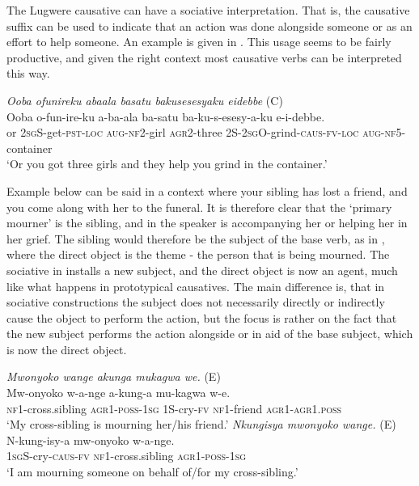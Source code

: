 \documentclass[output=paper,colorlinks,citecolor=brown,draftmode]{langscibook}
\begin{document}
The Lugwere causative can have a sociative interpretation. That is, the causative suffix can be used to indicate that an action was done alongside someone or as an effort to help someone. An example is given in . This usage seems to be fairly productive, and given the right context most causative verbs can be interpreted this way. %

\ea \label{ex:Saebo:sociative} \emph{Ooba 	ofunireku abaala basatu bakusesesyaku eidebbe} (C) \\
  \gll Ooba o-fun-ire-ku a-ba-ala ba-satu ba-ku-s-esesy-a-ku e-i-debbe. \\ 
or \textsc{2sg}S-get-\textsc{pst-loc} \textsc{aug-nf2}-girl \textsc{agr2}-three 2S-\textsc{2sg}O-grind-\textsc{caus-fv-loc} \textsc{aug-nf5}-container\\
    \glt  `Or you got three girls and they help you grind in the container.'     
      \z

Example  below can be said in a context where your sibling has lost a friend, and you come along with her to the funeral. It is therefore clear that the `primary mourner' is the sibling, and in  the speaker is accompanying her or helping her in her grief. The sibling would therefore be the subject of the base verb, as in , where the direct object is the theme - the person that is being mourned. The sociative in  installs a new subject, and the direct object is now an agent, much like what happens in prototypical causatives. The main difference is, that in sociative constructions the subject does not necessarily directly or indirectly cause the object to perform the action, but the focus is rather on the fact that the new subject performs the action alongside or in aid of the base subject, which is now the direct object.

\ea
\begin{xlist}   \label{ex:Saebo:grief}
 \ex \label{ex:Saebo:griefA} \emph{Mwonyoko wange akunga mukagwa we.} (E)\\
  \gll Mw-onyoko w-a-nge a-kung-a mu-kagwa w-e.\\ 
\textsc{nf1}-cross.sibling \textsc{agr1-poss-1sg} 1S-cry-\textsc{fv} \textsc{nf1}-friend \textsc{agr1-agr1.poss}\\ 
    \glt  `My cross-sibling is mourning her/his friend.' 
 \ex \label{ex:Saebo:griefB} \emph{Nkungisya mwonyoko wange.} (E)\\
  \gll  N-kung-isy-a mw-onyoko w-a-nge. \\ 
\textsc{1sg}S-cry-\textsc{caus-fv} \textsc{nf1}-cross.sibling \textsc{agr1-poss-1sg}\\
    \glt  `I am mourning someone on behalf of/for my cross-sibling.' 
      \end{xlist}     
      \z
\end{document}
